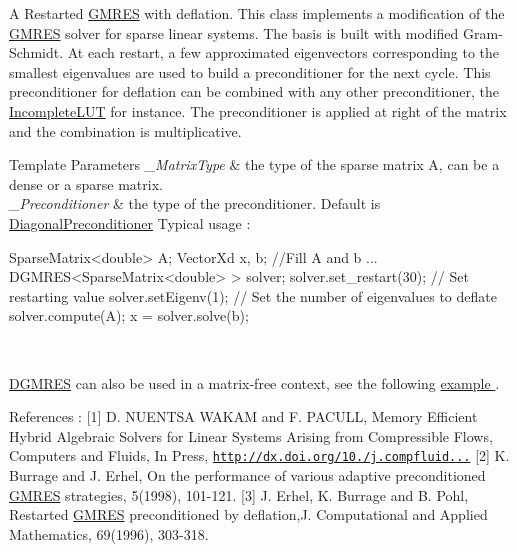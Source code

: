A Restarted \hyperlink{group___iterative_linear_solvers___module_class_eigen_1_1_g_m_r_e_s}{G\+M\+R\+ES} with deflation. This class implements a modification of the \hyperlink{group___iterative_linear_solvers___module_class_eigen_1_1_g_m_r_e_s}{G\+M\+R\+ES} solver for sparse linear systems. The basis is built with modified Gram-\/\+Schmidt. At each restart, a few approximated eigenvectors corresponding to the smallest eigenvalues are used to build a preconditioner for the next cycle. This preconditioner for deflation can be combined with any other preconditioner, the \hyperlink{group___iterative_linear_solvers___module_class_eigen_1_1_incomplete_l_u_t}{Incomplete\+L\+UT} for instance. The preconditioner is applied at right of the matrix and the combination is multiplicative. 


\begin{DoxyTemplParams}{Template Parameters}
{\em \+\_\+\+Matrix\+Type} & the type of the sparse matrix A, can be a dense or a sparse matrix. \\
\hline
{\em \+\_\+\+Preconditioner} & the type of the preconditioner. Default is \hyperlink{group___iterative_linear_solvers___module_class_eigen_1_1_diagonal_preconditioner}{Diagonal\+Preconditioner} Typical usage \+: 
\begin{DoxyCode}
SparseMatrix<double> A;
VectorXd x, b; 
\textcolor{comment}{//Fill A and b ...}
DGMRES<SparseMatrix<double> > solver;
solver.set\_restart(30); \textcolor{comment}{// Set restarting value}
solver.setEigenv(1); \textcolor{comment}{// Set the number of eigenvalues to deflate}
solver.compute(A);
x = solver.solve(b);
\end{DoxyCode}
\\
\hline
\end{DoxyTemplParams}
\hyperlink{class_eigen_1_1_d_g_m_r_e_s}{D\+G\+M\+R\+ES} can also be used in a matrix-\/free context, see the following \hyperlink{group___matrixfree_solver_example}{example }.

References \+: \mbox{[}1\mbox{]} D. N\+U\+E\+N\+T\+SA W\+A\+K\+AM and F. P\+A\+C\+U\+LL, Memory Efficient Hybrid Algebraic Solvers for Linear Systems Arising from Compressible Flows, Computers and Fluids, In Press, \href{http://dx.doi.org/10.1016/j.compfluid.2012.03.023}{\tt http\+://dx.\+doi.\+org/10./j.\+compfluid...} \mbox{[}2\mbox{]} K. Burrage and J. Erhel, On the performance of various adaptive preconditioned \hyperlink{group___iterative_linear_solvers___module_class_eigen_1_1_g_m_r_e_s}{G\+M\+R\+ES} strategies, 5(1998), 101-\/121. \mbox{[}3\mbox{]} J. Erhel, K. Burrage and B. Pohl, Restarted \hyperlink{group___iterative_linear_solvers___module_class_eigen_1_1_g_m_r_e_s}{G\+M\+R\+ES} preconditioned by deflation,J. Computational and Applied Mathematics, 69(1996), 303-\/318. 

